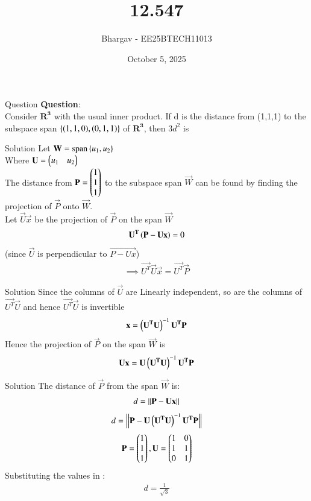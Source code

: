 \documentclass{beamer}
\title{12.547}
\date{October 5, 2025}
\author{Bhargav - EE25BTECH11013}
\begin{document}
\frame{\titlepage}

\begin{frame}{Question}
\textbf{Question}: \\
Consider $\mathbf{R^3}$ with the usual inner product. If d  is the distance from (1,1,1) to the subspace span $\left\{(1,1,0), (0,1,1)\right\}$ of $\mathbf{R^3}$, then $3d^2$ is
\end{frame}
\begin{frame}{Solution}
Let
$\mathbf{W} = \operatorname{span}\left\{u_1, u_2\right\}$\\
Where $\mathbf{U} = \begin{pmatrix}u_1 & u_2\end{pmatrix}$ \\

The distance from $\mathbf{P} = \begin{pmatrix}1 \\ 1 \\ 1\end{pmatrix}$ to the subspace span $\vec{W}$ can be found by finding the projection of $\vec{P}$ onto $\vec{W}$.\\
Let $\vec{U}\vec{x}$ be the projection of $\vec{P}$ on the span $\vec{W}$
\begin{align}
\mathbf{U^T}\left(\mathbf{P-Ux}\right)=0
\end{align}
(since $\vec{U}$ is perpendicular to $\vec{P-Ux}$)
\begin{align}
\implies \vec{U^T}\vec{U}\vec{x} = \vec{U^T}\vec{P}
\end{align}
\end{frame}

\begin{frame}{Solution}
Since the columns of $\vec{U}$ are Linearly independent, so are the columns of $\vec{U^T}\vec{U}$ and hence $\vec{U^T}\vec{U}$ is invertible 
\begin{align}
\mathbf{x} = \left(\mathbf{U^T}\mathbf{U}\right)^{-1} \mathbf{U^T}\mathbf{P}
\end{align}
Hence the projection of $\vec{P}$ on the span $\vec{W}$ is
\begin{align}
\mathbf{U}\mathbf{x} = \mathbf{U}\left(\mathbf{U^T}\mathbf{U}\right)^{-1} \mathbf{U^T}\mathbf{P}
\end{align}
\end{frame}

\begin{frame}{Solution}
The distance of $\vec{P}$ from the span $\vec{W}$ is:
\begin{align}
d = \left\lVert\mathbf{P} - \mathbf{U}\mathbf{x}\right\rVert
\end{align}
\begin{align}
d = \left\lVert\mathbf{P} - \mathbf{U}\left(\mathbf{U^T}\mathbf{U}\right)^{-1} \mathbf{U^T}\mathbf{P}\right\rVert
\end{align}
\begin{align}
\mathbf{P} = \begin{pmatrix}1 \\ 1 \\ 1\end{pmatrix}, \mathbf{U} = \begin{pmatrix}1 & 0 \\ 1 & 1 \\ 0 & 1\end{pmatrix}
\end{align}
Substituting the values in :
\begin{align}
d = \frac{1}{\sqrt{3}}
\end{align}


\end{frame}
\end{document}
